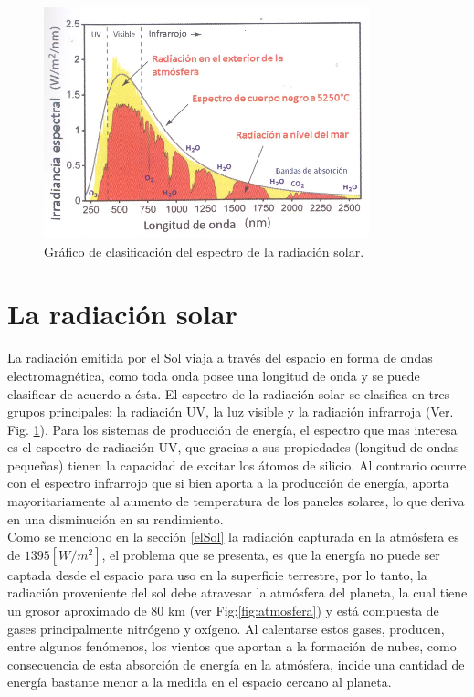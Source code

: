 \begin{figure}[h!]
        \centering
        \includegraphics[scale=0.45]{images/espectroSolar}
        \caption{Gráfico de clasificación del espectro de la radiación solar\cite{recursoSolar:1}.}
	\label{espectro}
\end{figure}

\section{La radiación solar}
La radiación emitida por el Sol viaja a través del espacio en forma de ondas electromagnética, como toda onda posee una longitud de onda y se puede clasificar de acuerdo a ésta. El espectro de la radiación solar se clasifica en tres grupos principales: la radiación UV, la luz visible y la radiación infrarroja (Ver. Fig. \ref{espectro}). Para los sistemas de producción de energía, el espectro que mas interesa es el espectro de radiación UV, que gracias a sus propiedades (longitud de ondas pequeñas) tienen la capacidad de excitar los átomos de silicio. Al contrario ocurre con el espectro infrarrojo que si bien aporta a la producción de energía, aporta mayoritariamente al aumento de temperatura de los paneles solares, lo que deriva en una disminución en su rendimiento.\\

Como se menciono en la sección \ref{elSol} la radiación capturada en la atmósfera es de $1395 [W/m^{2}]$, el problema que se presenta, es que la energía no puede ser captada desde el espacio para uso en la superficie terrestre, por lo tanto, la radiación proveniente del sol debe atravesar la atmósfera del planeta, la cual tiene un grosor aproximado de 80 km (ver Fig:\ref{fig:atmosfera}) y está compuesta de gases principalmente nitrógeno y oxígeno\cite{recursoSolar:1}. Al calentarse estos gases, producen, entre algunos fenómenos, los vientos que aportan a la formación de nubes, como consecuencia de esta absorción de energía en la atmósfera, incide una cantidad de energía bastante menor a la medida en el espacio cercano al planeta.\\

